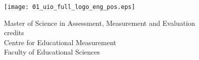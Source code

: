 \begin{titlepage}
    \thispagestyle{empty} %
    \centering %

    \vspace{5\baselineskip}

    \texttt{[image: 01\_uio\_full\_logo\_eng\_pos.eps]}\\[\baselineskip]

    \fontsize{24}{20pt}\selectfont
    \titlet\par
    \vspace{1\baselineskip}

    \fontsize{16}{12pt}\selectfont
    \authort\par
    \vspace{2.5\baselineskip}

    \vspace{6\baselineskip}

    \fontsize{16}{16pt}\selectfont Master of Science in Assessment, Measurement and Evaluation\\
    \fontsize{16}{16pt} credits\\[1.5\baselineskip]

    \fontsize{16}{12pt}\selectfont Centre for Educational Measurement\\
    \fontsize{16}{12pt}\selectfont Faculty of Educational Sciences\\[1.5\baselineskip]

    \fontsize{12}{12pt}\selectfont \semester\par
\end{titlepage}

\cleardoublepage
